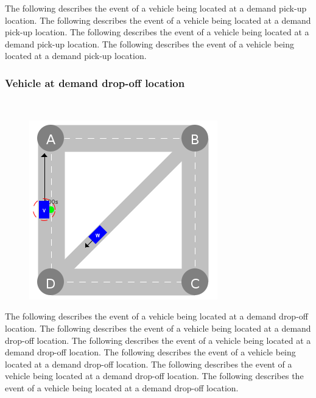 \documentclass[graybox]{svmult}
\begin{document}
The following describes the event of a vehicle being located at a demand pick-up location.
The following describes the event of a vehicle being located at a demand pick-up location.
The following describes the event of a vehicle being located at a demand pick-up location.
The following describes the event of a vehicle being located at a demand pick-up location.

\subsubsection{Vehicle at demand drop-off location}
\
\begin{figure}
	\centering
		\includegraphics[scale=0.35]{../../events/vehicle-at-demand-drop-off.png}
\end{figure}

The following describes the event of a vehicle being located at a demand drop-off location.
The following describes the event of a vehicle being located at a demand drop-off location.
The following describes the event of a vehicle being located at a demand drop-off location.
The following describes the event of a vehicle being located at a demand drop-off location.
The following describes the event of a vehicle being located at a demand drop-off location.
The following describes the event of a vehicle being located at a demand drop-off location.
\end{document}
